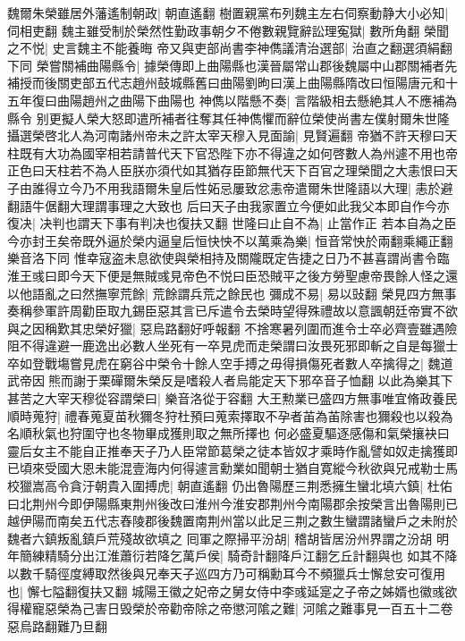 魏爾朱榮雖居外藩遙制朝政|{
	朝直遙翻}
樹置親黨布列魏主左右伺察動静大小必知|{
	伺相吏翻}
魏主雖受制於榮然性勤政事朝夕不倦數親覽辭訟理寃獄|{
	數所角翻}
榮聞之不悦|{
	史言魏主不能養晦}
帝又與吏部尚書李神儁議清治選部|{
	治直之翻選須絹翻下同}
榮嘗關補曲陽縣令|{
	據榮傳即上曲陽縣也漢晉屬常山郡後魏屬中山郡關補者先補授而後關吏部五代志趙州鼓城縣舊曰曲陽劉昫曰漢上曲陽縣隋改曰恒陽唐元和十五年復曰曲陽趙州之曲陽下曲陽也}
神儁以階懸不奏|{
	言階級相去懸絶其人不應補為縣令}
别更擬人榮大怒即遣所補者往奪其任神儁懼而辭位榮使尚書左僕射爾朱世隆攝選榮啓北人為河南諸州帝未之許太宰天穆入見面諭|{
	見賢遍翻}
帝猶不許天穆曰天柱既有大功為國宰相若請普代天下官恐陛下亦不得違之如何啓數人為州遽不用也帝正色曰天柱若不為人臣朕亦須代如其猶存臣節無代天下百官之理榮聞之大恚恨曰天子由誰得立今乃不用我語爾朱皇后性妬忌屢致忿恚帝遣爾朱世隆語以大理|{
	恚於避翻語牛倨翻大理謂事理之大致也}
后曰天子由我家置立今便如此我父本即自作今亦復决|{
	决判也謂天下事有判决也復扶又翻}
世隆曰止自不為|{
	止當作正}
若本自為之臣今亦封王矣帝既外逼於榮内逼皇后恒快怏不以萬乘為樂|{
	恒音常怏於兩翻乘繩正翻樂音洛下同}
惟幸寇盗未息欲使與榮相持及關隴既定告捷之日乃不甚喜謂尚書令臨淮王彧曰即今天下便是無賊彧見帝色不悦曰臣恐賊平之後方勞聖慮帝畏餘人怪之還以他語亂之曰然撫寧荒餘|{
	荒餘謂兵荒之餘民也}
彌成不易|{
	易以䜴翻}
榮見四方無事奏稱參軍許周勸臣取九錫臣惡其言已斥遣令去榮時望得殊禮故以意諷朝廷帝實不欲與之因稱歎其忠榮好獵|{
	惡烏路翻好呼報翻}
不捨寒暑列圍而進令士卒必齊壹雖遇險阻不得違避一鹿逸出必數人坐死有一卒見虎而走榮謂曰汝畏死邪即斬之自是每獵士卒如登戰塲嘗見虎在窮谷中榮令十餘人空手搏之毋得損傷死者數人卒擒得之|{
	魏道武帝因熊而謝于栗磾爾朱榮反是嗜殺人者烏能定天下邪卒音子恤翻}
以此為樂其下甚苦之大宰天穆從容謂榮曰|{
	樂音洛從于容翻}
大王勲業已盛四方無事唯宜脩政養民順時蒐狩|{
	禮春蒐夏苗秋獮冬狩杜預曰蒐索擇取不孕者苖為苖除害也獮殺也以殺為名順秋氣也狩圍守也冬物畢成獲則取之無所擇也}
何必盛夏驅逐感傷和氣榮攘袂曰靈后女主不能自正推奉天子乃人臣常節葛榮之徒本皆奴才乘時作亂譬如奴走擒獲即已頃來受國大恩未能混壹海内何得遽言勳業如聞朝士猶自寛縱今秋欲與兄戒勒士馬校獵嵩高令貪汙朝貴入圍搏虎|{
	朝直遙翻}
仍出魯陽歷三荆悉擁生蠻北填六鎮|{
	杜佑曰北荆州今即伊陽縣東荆州後改曰淮州今淮安郡荆州今南陽郡余按榮言出魯陽則已越伊陽而南矣五代志舂陵郡後魏置南荆州當以此足三荆之數生蠻謂諸蠻戶之未附於魏者六鎮叛亂鎮戶荒殘故欲填之}
囘軍之際掃平汾胡|{
	稽胡皆居汾州界謂之汾胡}
明年簡練精騎分出江淮蕭衍若降乞萬戶侯|{
	騎奇計翻降戶江翻乞丘計翻與也}
如其不降以數千騎徑度縛取然後與兄奉天子巡四方乃可稱勳耳今不頻獵兵士懈怠安可復用也|{
	懈七隘翻復扶又翻}
城陽王徽之妃帝之舅女侍中李彧延寔之子帝之姊婿也徽彧欲得權寵惡榮為己害日毁榮於帝勸帝除之帝懲河隂之難|{
	河隂之難事見一百五十二卷惡烏路翻難乃旦翻}
